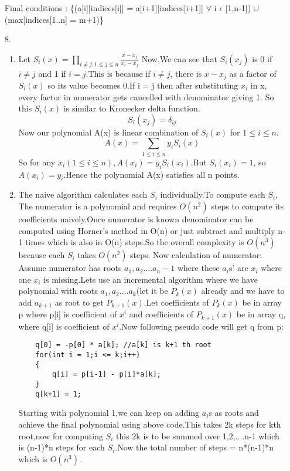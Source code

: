 \documentclass[12pt]{article}
\begin{document}
\begin{enumerate}
    Final conditions : \{(a[i][indices[i]] = a[i+1][indices[i+1]] $\forall$ i $\epsilon$ [1,n-1]) $\cup$ (max[indices[1..n] = m+1)\}
    \item[8.]
    \begin{enumerate}
        \item Let $S_i(x) = \prod_{i\neq j,1 \leq j \leq n} \frac{x-x_j}{x_i-x_j}$
Now,We can see that $S_i(x_j)$ is 0 if $i \neq j$ and 1 if $i = j$.This is because if $i \neq j$, there is $x-x_j$ as a factor of $S_i(x)$ so its value becomes 0.If i = j then after substituting $x_i$ in x, every factor in numerator gets cancelled with denominator giving 1.
So this $S_i(x)$ is similar to Kronecker delta function.
\begin{equation*}
    S_i(x_j) = \delta_{ij}
\end{equation*}
Now our polynomial A(x) is linear combination of $S_i(x)$ for $1 \leq i \leq n$.
\begin{equation*}
    A(x) = \sum_{1 \leq i \leq n}{y_i S_i(x)}
\end{equation*}
So for any $x_i(1 \leq i \leq n) , A(x_i) = y_i S_i(x_i)$.But $S_i(x_i)=1$, so $A(x_i)=y_i$.Hence
the polynomial A(x) satisfies all n points.
\item
The naive algorithm calculates each $S_i$ individually.To compute each $S_i$, The numerator is a polynomial and requires $O(n^2)$ steps to compute its coefficients naively.Once numerator is known denominator can be computed using Horner's method in O(n) or just subtract and multiply n-1 times which is also in O(n) steps.So the overall complexity is $O(n^3)$ because each $S_i$ takes $O(n^2)$ steps.
Now calculation of numerator:
Assume numerator has roots $a_1,a_2....a_n-1$ where these $a_i$s' are $x_i$ where one $x_i$ is missing.Lets use an incremental algorithm where we have polynomial with roots $a_1,a_2....a_k$(let it be $P_{k}(x)$ already and we have to add $a_{k+1}$ as root to get $P_{k+1}(x)$.Let coefficients of $P_k(x)$ be in array p where p[i] is coefficient of $x^i$ and coefficients of $P_{k+1}(x)$ be in array q, where q[i] is coefficient of $x^i$.Now following pseudo code will get q from p:
    \begin{verbatim}
    q[0] = -p[0] * a[k]; //a[k] is k+1 th root
    for(int i = 1;i <= k;i++)
    {
        q[i] = p[i-1] - p[i]*a[k];
    }
    q[k+1] = 1;
    \end{verbatim}
Starting with polynomial 1,we can keep on adding $a_i$s as roots and achieve the final polynomial using above code.This takes 2k steps for kth root,now for computing $S_i$ this 2k is to be summed over 1,2,....n-1 which is (n-1)*n steps for each $S_i$.Now the total number of steps = n*(n-1)*n which is $O(n^3)$.

\end{enumerate}
\end{enumerate}
\end{document}
